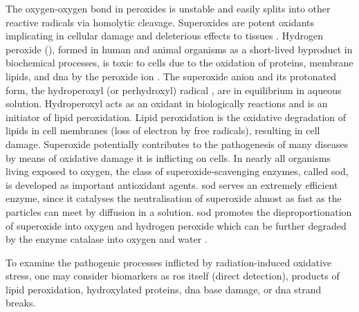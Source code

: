 \documentclass[
twoside,
openright,
titlepage,
numbers=noenddot,
headinclude,
fleqn,
a4paper,
footinclude=true,
cleardoublepage=empty,
abstractoff,
BCOR=5mm,
paper=a4,
fontsize=11pt,
british,ngerman,american,
]{scrreprt}
\begin{document}
The oxygen-oxygen bond in peroxides  is unstable
and easily splits into other reactive radicals via homolytic cleavage.
Superoxides are potent oxidants implicating in cellular damage and
deleterious effects to tissues
\cite{Forest1999}. %
Hydrogen peroxide (), formed in human and animal
organisms as a short-lived byproduct in biochemical processes, is
toxic to cells due to the oxidation of proteins, membrane lipids, and
\ac{dna} by the peroxide ion \cite{Loeffler2003}.  The superoxide
anion  and its protonated form, the hydroperoxyl (or
perhydroxyl) radical , are in equilibrium in aqueous
solution.  Hydroperoxyl acts as an oxidant in biologically reactions
and is an initiator of lipid peroxidation.  Lipid peroxidation is the
oxidative degradation of lipids in cell membranes (loss of electron by
free radicals), resulting in cell damage.  Superoxide potentially
contributes to the pathogenesis of many diseases by means of 
oxidative damage it is inflicting on cells.  In nearly all organisms
living exposed to oxygen, the class of superoxide-scavenging enzymes,
called \ac{sod}, is developed as important antioxidant agents.
\ac{sod} serves an extremely efficient enzyme, since it catalyses the
neutralisation of superoxide almost as fast as the particles can meet
by diffusion in a solution.  \ac{sod} promotes the disproportionation
of superoxide into oxygen and hydrogen peroxide which can be further
degraded by the enzyme catalase into oxygen and water
\cite{Loeffler2003}.

To examine the pathogenic processes inflicted by radiation-induced
oxidative stress, one may consider biomarkers as  \ac{ros} itself
(direct detection), products of lipid peroxidation,
hydroxylated proteins, \ac{dna} base damage, or \ac{dna} strand
breaks.
\end{document}
